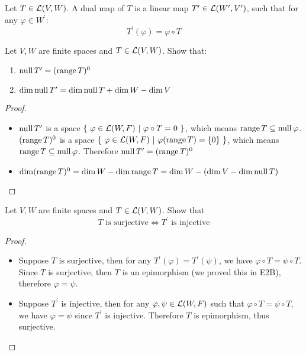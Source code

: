 \documentclass[../main.tex]{subfiles}
\begin{document}
\setcounter{definition}{117}
\begin{definition}
  Let $T \in \mathcal{L}(V, W)$. A dual map of $T$ is a linear map $T^\prime \in \mathcal{L}(W^\prime, V^\prime)$, such that
  for any $\varphi \in W^\prime$:
  \[
  T^\prime(\varphi) = \varphi \circ T
  \]
\end{definition}

\setcounter{theorem}{127}
\begin{theorem}
  Let $V, W$ are finite spaces and $T \in \mathcal{L}(V, W)$. Show that:
  \begin{enumerate}
    \item $\operatorname{null} T^\prime = (\operatorname{range} T)^0$
    \item $\dim \operatorname{null} T^\prime = \dim \operatorname{null} T + \dim W - \dim V$
  \end{enumerate}
\end{theorem}
\begin{proof}
  ~
  \begin{itemize}
    \item $\operatorname{null} T^\prime$ is a space $\{ \ \varphi \in \mathcal{L}(W, F) \ | \ \varphi \circ T = 0 \ \}$,
          which means $\operatorname{range} T \subseteq \operatorname{null} \varphi$.
          $(\operatorname{range} T)^0$ is a space $\{ \ \varphi \in \mathcal{L}(W, F) \ | \ \varphi(\operatorname{range} T) = \{0\} \ \}$,
          which means $\operatorname{range} T \subseteq \operatorname{null} \varphi$.
          Therefore $\operatorname{null} T^\prime = (\operatorname{range} T)^0$
    \item $\dim (\operatorname{range} T)^0 = \dim W - \dim \operatorname{range} T = \dim W - (\dim V - \dim \operatorname{null} T)$
  \end{itemize}
\end{proof}

\begin{theorem}
  Let $V, W$ are finite spaces and $T \in \mathcal{L}(V, W)$. Show that
  \[
  T \text{ is surjective} \iff T^\prime \text{ is injective}
  \]
\end{theorem}
\begin{proof}
  ~
  \begin{itemize}
    \item Suppose $T$ is surjective, then for any $T^\prime(\varphi) = T^\prime(\psi)$,
          we have $\varphi \circ T = \psi \circ T$. Since $T$ is surjective, then $T$
          is an epimorphism (we proved this in \textnormal{E2B}),
          therefore $\varphi = \psi$.

    \item Suppose $T^\prime$ is injective, then for any $\varphi, \psi \in \mathcal{L}(W, F)$
          such that $\varphi \circ T = \psi \circ T$, we have $\varphi = \psi$
          since $T^\prime$ is injective. Therefore $T$ is epimorphism, thus surjective.
  \end{itemize}
\end{proof}
\end{document}
